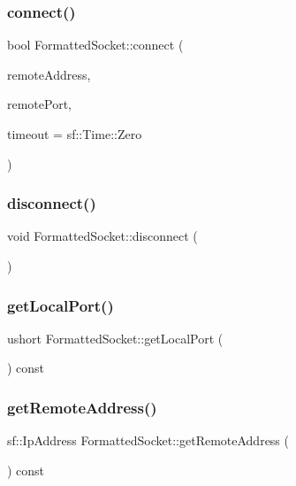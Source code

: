 \subsubsection{\texorpdfstring{connect()}{connect()}}
{\footnotesize\ttfamily bool Formatted\+Socket\+::connect (\begin{DoxyParamCaption}\item[{const sf\+::\+Ip\+Address \&}]{remote\+Address,  }\item[{const ushort \&}]{remote\+Port,  }\item[{const sf\+::\+Time \&}]{timeout = {\ttfamily sf\+:\+:Time\+:\+:Zero} }\end{DoxyParamCaption})}

\mbox{\label{class_formatted_socket_a4b64885e3fb07ac50107facd1114050d}} 
\subsubsection{\texorpdfstring{disconnect()}{disconnect()}}
{\footnotesize\ttfamily void Formatted\+Socket\+::disconnect (\begin{DoxyParamCaption}{ }\end{DoxyParamCaption})}

\mbox{\label{class_formatted_socket_a92c58f5322606d1dbcd61cea00ee4da5}} 
\subsubsection{\texorpdfstring{getLocalPort()}{getLocalPort()}}
{\footnotesize\ttfamily ushort Formatted\+Socket\+::get\+Local\+Port (\begin{DoxyParamCaption}{ }\end{DoxyParamCaption}) const}

\mbox{\label{class_formatted_socket_af9aee61bd02f369a9980b2402fef1db9}} 
\subsubsection{\texorpdfstring{getRemoteAddress()}{getRemoteAddress()}}
{\footnotesize\ttfamily sf\+::\+Ip\+Address Formatted\+Socket\+::get\+Remote\+Address (\begin{DoxyParamCaption}{ }\end{DoxyParamCaption}) const}

